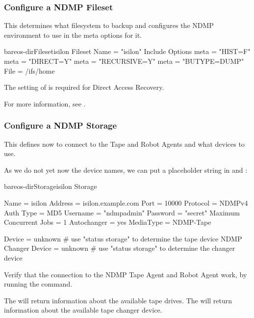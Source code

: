 \subsubsection{Configure a NDMP Fileset}

This determines what filesystem to backup and configures the NDMP environment to use in the meta options for it.

\begin{bareosConfigResource}{bareos-dir}{Fileset}{isilon}
Fileset {
    Name = "isilon"
    Include {
        Options {
            meta = "HIST=F"
            meta = "DIRECT=Y"
            meta = "RECURSIVE=Y"
            meta = "BUTYPE=DUMP"
        }
    File = /ifs/home
    }
}
\end{bareosConfigResource}


The setting of  is required for Direct Access Recovery.

For more information, see .



\subsubsection{Configure a NDMP Storage}

This defines now to connect to the Tape and Robot Agents and what devices to use.

As we do not yet now the device names, we can put a placeholder string in
 and
:

\begin{bareosConfigResource}{bareos-dir}{Storage}{isilon}
Storage {
  Name = isilon
  Address = isilon.example.com
  Port = 10000
  Protocol = NDMPv4
  Auth Type = MD5
  Username = "ndmpadmin"
  Password = "secret"
  Maximum Concurrent Jobs = 1
  Autochanger = yes
  MediaType = NDMP-Tape

  Device = unknown               # use "status storage" to determine the tape device
  NDMP Changer Device = unknown  # use "status storage" to determine the changer device
}
\end{bareosConfigResource}

Verify that the connection to the NDMP Tape Agent and Robot Agent work,
by running the  command.

The \TapeAgent will return information about the available tape drives.
The \RobotAgent will return information about the available tape changer device.


